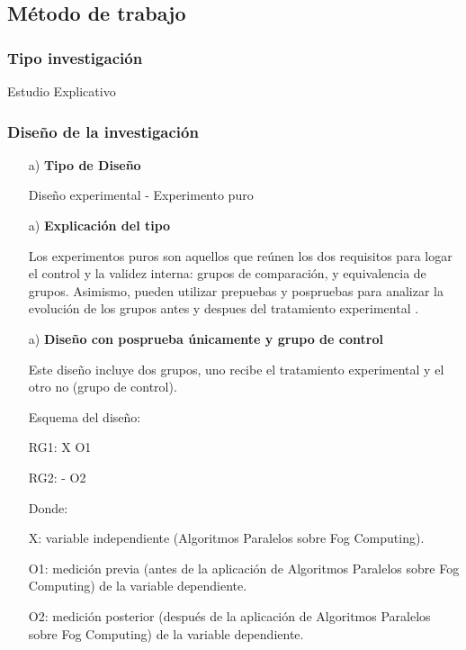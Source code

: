     \subsection{Método de trabajo}    
            \subsubsection{Tipo investigación}
                Estudio Explicativo
            \subsubsection{Diseño de la investigación}
                \begin{enumerate}
                    \item[a)]{\bf Tipo de Diseño}\par
                        Diseño experimental - Experimento puro 
                    \item[a)]{\bf Explicación del tipo}\par
                        Los experimentos puros son aquellos que reúnen los dos requisitos para logar el control y la validez interna: grupos de comparación, y equivalencia de grupos. Asimismo, pueden utilizar prepuebas y pospruebas para analizar la evolución de los grupos antes y despues del tratamiento experimental {\cite{sampieri1997}}. 
                    \item[a)]{\bf Diseño con posprueba únicamente y grupo de control}\par
                        Este diseño incluye dos grupos, uno recibe el tratamiento experimental y el otro no (grupo  de control).\par
                        Esquema del diseño:\par
                        \begin{center}
                            { RG1: X O1}\par
                            { RG2: - O2}\par
                        \end{center} 
                        Donde:\par 
                        X: variable independiente (Algoritmos Paralelos sobre Fog Computing).\par
                        O1: medición previa (antes de la aplicación de Algoritmos Paralelos sobre Fog Computing) de la variable dependiente.\par
                        O2: medición posterior (después de la aplicación de Algoritmos Paralelos sobre Fog Computing) de la variable dependiente.\par
                \end{enumerate}  
